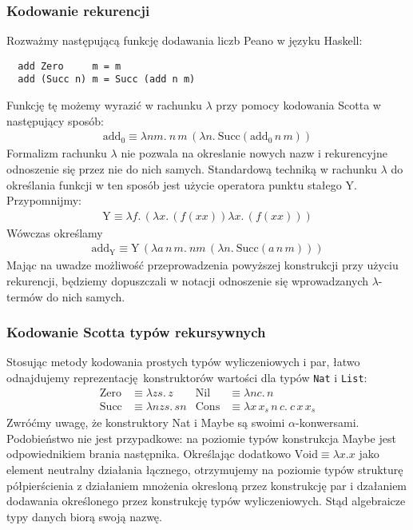 \subsubsection{Kodowanie rekurencji}\label{sec:adt_recurrency}
 Rozważmy następującą funkcję dodawania liczb Peano w języku Haskell:
\begin{verbatim}
  add Zero     m = m
  add (Succ n) m = Succ (add n m)
\end{verbatim}
Funkcję tę możemy wyrazić w rachunku \(\lambda\) przy pomocy kodowania Scotta w następujący sposób:
\begin{align*}
  \mathrm{add_0} \equiv \lambda n m.\:n\,m\,(\lambda n.\:\mathrm{Succ}(\mathrm{add_0}\,n\,m))
\end{align*}
Formalizm rachunku \(\lambda\) nie pozwala na okreslanie nowych nazw i rekurencyjne odnoszenie się przez nie do nich samych. Standardową techniką w rachunku \(\lambda\) do określania funkcji w ten sposób jest użycie operatora punktu stałego Y. Przypomnijmy:
\begin{align*}
  \mathrm{Y}\equiv\lambda f.\,(\lambda x.\,(f(xx))\lambda x.\,(f(xx)))
\end{align*}
Wówczas określamy
\begin{align*}
  \mathrm{add_Y}\equiv \mathrm{Y}\,(\lambda a\,n\, m .\ n m\,(\lambda n.\ \mathrm{Succ} (a\,n\,m)))
\end{align*}
Mając na uwadze możliwość przeprowadzenia powyższej konstrukcji przy użyciu rekurencji, będziemy dopuszczali w notacji odnoszenie się wprowadzanych \(\lambda\)-termów do nich samych.

\subsubsection{Kodowanie Scotta typów rekursywnych}
Stosując metody kodowania prostych typów wyliczeniowych i par, łatwo odnajdujemy reprezentację konstruktorów wartości dla typów \texttt{Nat} i \texttt{List}:
\begin{align*}
  \mathrm{Zero} &\equiv \lambda z s .\, z     & \mathrm{Nil} &\equiv \lambda n c.\,n\\
  \mathrm{Succ} &\equiv \lambda n z s.\,sn    & \mathrm{Cons} &\equiv \lambda x \, x_s \, n\, c.\ c \, x \, x_s
\end{align*}
  Zwróćmy uwagę, że konstruktory Nat i Maybe są swoimi \(\alpha\)-konwersami. Podobieństwo nie jest przypadkowe: na poziomie typów konstrukcja Maybe jest odpowiednikiem brania następnika. Określając dodatkowo \(\mathrm{Void}\equiv\lambda x.x\) jako element neutralny działania łącznego, otrzymujemy na poziomie typów strukturę półpierścienia z działaniem mnożenia okresloną przez konstrukcję par i dzałaniem dodawania określonego przez konstrukcję typów wyliczeniowych. Stąd algebraicze typy danych biorą swoją nazwę.

